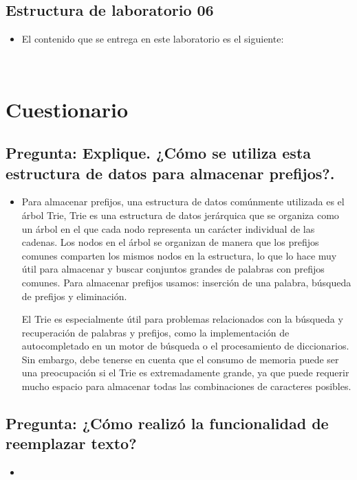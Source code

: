 \documentclass{article}
\begin{document}
	\subsection{Estructura de laboratorio 06}
	\begin{itemize}	
		\item El contenido que se entrega en este laboratorio es el siguiente:
	\end{itemize}
	
\begin{lstlisting}[style=ascii-tree]
        
\end{lstlisting}  

\section{Cuestionario}
\subsection{Pregunta: Explique. ¿Cómo se utiliza esta estructura de datos para almacenar prefijos?.}
	\begin{itemize}
	\item  	Para almacenar prefijos, una estructura de datos comúnmente utilizada es el árbol Trie, Trie es una estructura de datos jerárquica que se organiza como un árbol en el que cada nodo representa un carácter individual de las cadenas. Los nodos en el árbol se organizan de manera que los prefijos comunes comparten los mismos nodos en la estructura, lo que lo hace muy útil para almacenar y buscar conjuntos grandes de palabras con prefijos comunes. Para almacenar prefijos usamos: inserción de una palabra, búsqueda de prefijos y eliminación.

El Trie es especialmente útil para problemas relacionados con la búsqueda y recuperación de palabras y prefijos, como la implementación de autocompletado en un motor de búsqueda o el procesamiento de diccionarios. Sin embargo, debe tenerse en cuenta que el consumo de memoria puede ser una preocupación si el Trie es extremadamente grande, ya que puede requerir mucho espacio para almacenar todas las combinaciones de caracteres posibles.

	
	\end{itemize}
	\subsection{Pregunta: ¿Cómo realizó la funcionalidad de reemplazar texto?}
	\begin{itemize}
	\item  	

	
	\end{itemize}		
	
\end{document}
